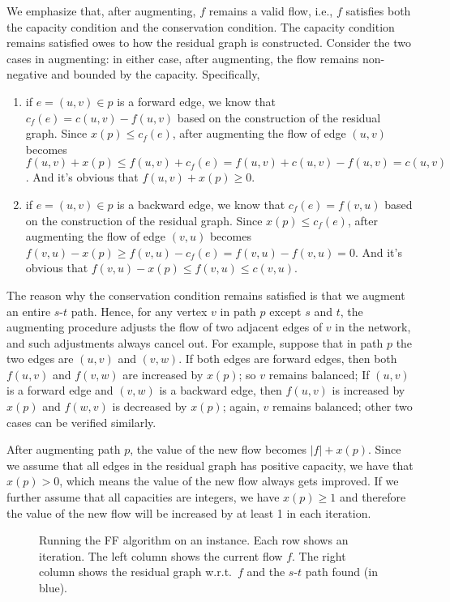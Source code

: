 \documentclass[letterpaper,11pt]{article}
\theoremstyle{mytheorem}
\begin{document}
We emphasize that, after augmenting, $f$ remains a valid flow, i.e., $f$ satisfies
both the capacity condition and the conservation condition. The capacity
condition remains satisfied owes to how the residual graph is constructed.
Consider the two cases in augmenting: in either case, after augmenting, the
flow remains non-negative and bounded by the capacity. Specifically,

\vspace*{-\topsep}
\begin{enumerate}
\item if $e=(u,v)\in p$ is a forward edge, we know that $c_f(e)=c(u,v)-f(u,v)$ based on the
construction of the residual graph. Since $x( p) \le c_f (e)$, after augmenting the
flow of edge $(u, v)$ becomes $f(u, v) + x(p) \le f(u,v)+c_f (e) = f(u,v)+c(u,v)- f(u,v) = c(u,v)$. 
And it’s obvious that $f(u,v)+x(p) \ge 0$.
\item if $e=(u,v)\in p$ is a backward edge, we know that $c_f(e)=f(v,u)$ based on the
construction of the residual graph. Since $x(p) \le c_f(e)$, after augmenting the
flow of edge $(v, u)$ becomes $f(v, u) - x(p) \ge f(v,u)-c_f (e) = f(v,u)-f(v,u) = 0$. 
And it’s obvious that $f(v,u)-x(p) \le f(v,u) \le c(v,u)$.
\end{enumerate}

The reason why the conservation condition remains satisfied is that we augment an entire $s$-$t$ path. Hence,
for any vertex $v$ in path $p$ except $s$ and $t$, the augmenting procedure adjusts the
flow of two adjacent edges of $v$ in the network, and such adjustments always
cancel out. For example, suppose that in path $p$ the two edges are $(u,v)$ and
$(v,w)$. If both edges are forward edges, then both $f(u,v)$ and $f(v,w)$ are
increased by $x(p)$; so $v$ remains balanced; If $(u, v)$ is a forward edge and $(v,
		w)$ is a backward edge, then $f (u, v)$ is increased by $x(p)$ and $f(w,v)$ is
decreased by $x(p)$; again, $v$ remains balanced; other two cases can be verified
similarly.

After augmenting path $p$, the value of the new flow becomes $|f|+x(p)$. Since we
assume that all edges in the residual graph has positive capacity, we have that
$x(p) > 0$, which means the value of the new flow always gets improved. If we
further assume that all capacities are integers, we have $x(p) \ge 1$ and therefore
the value of the new flow will be increased by at least 1 in each iteration.

\begin{figure}[h]
\centering{}
\caption{Running the FF algorithm on an instance. Each row shows an iteration. The left column shows
the current flow $f$. The right column shows the residual graph w.r.t.\ $f$ and the $s$-$t$ path found (in blue).}
\label{fig:ff}
\end{figure}
\end{document}
